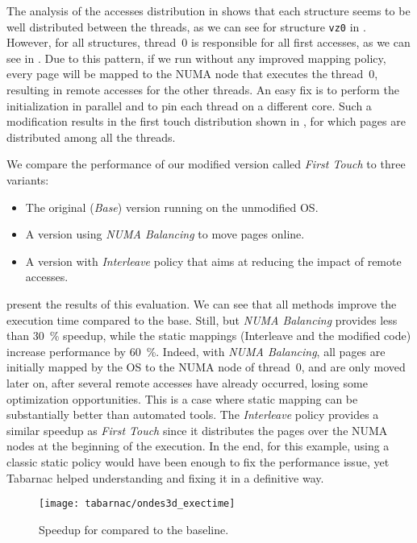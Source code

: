 The analysis of the accesses distribution in \Ondes shows that each structure seems to be well distributed between the threads, as we can see for structure \texttt{vz0} in .
However, for all structures, thread~$0$ is responsible for all first accesses, as we can see in .
Due to this pattern, if we run \Ondes without any improved mapping policy, every page will be mapped to the \gls{NUMA} node that executes the thread~$0$, resulting in remote
accesses for the other threads.
An easy fix is to perform the initialization in parallel and to pin each thread on a different core.
Such a modification results in the first touch distribution shown in , for which pages are distributed among all the threads.

We compare the performance of our modified version called \emph{First Touch} to three variants:
\begin{itemize}
    \item The original (\emph{Base}) version running on the unmodified \gls{OS}.
    \item A version using \emph{NUMA Balancing} to move pages online.
    \item A version with \emph{Interleave} policy that aims at reducing the impact of remote accesses.
\end{itemize}
 present the results of this evaluation.
We can see that all methods improve the execution time compared to the base.
Still, but \emph{NUMA Balancing} provides less than \SI{30}{\%} speedup, while the static mappings (Interleave and the modified code) increase performance by \SI{60}{\%}.
Indeed, with \emph{NUMA Balancing}, all pages are initially mapped by the \gls{OS} to the \gls{NUMA} node of thread~$0$, and are only moved later on, after several remote accesses have already occurred, losing some optimization opportunities.
This is a case where static mapping can be substantially better than automated tools.
The \emph{Interleave} policy provides a similar speedup as \emph{First Touch} since it distributes the pages over the \gls{NUMA} nodes at the beginning of the execution.
In the end, for this example, using a classic static policy would have been enough to fix the performance issue, yet \gls{Tabarnac} helped understanding and fixing it in a definitive way.

\begin{figure}[htb]
    \centering
    \texttt{[image: tabarnac/ondes3d\_exectime]}
    \caption[Speedup for \Ondes.]{Speedup for \Ondes compared to the baseline.}
    \label{fig:ondes-res}
\end{figure}

